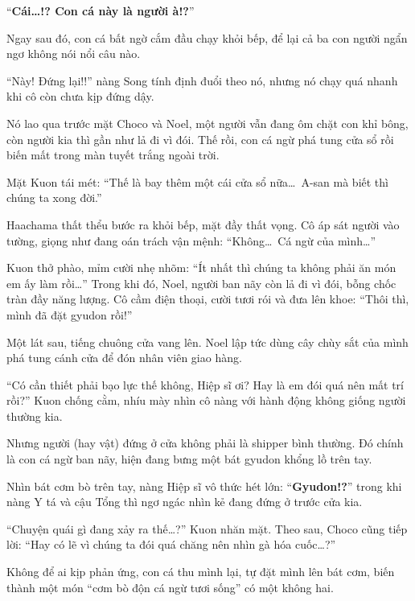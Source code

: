 \documentclass[../main.tex]{subfiles}
\begin{document}

``\textbf{Cái\dots!? Con cá này là người à!?}''

Ngay sau đó, con cá bất ngờ cắm đầu chạy khỏi bếp, để lại cả ba con người ngẩn ngơ không nói nổi câu nào.

``Này! Đứng lại!!'' nàng Song tính định đuổi theo nó, nhưng nó chạy quá nhanh khi cô còn chưa kịp đứng dậy.

Nó lao qua trước mặt Choco và Noel, một người vẫn đang ôm chặt con khỉ bông, còn người kia thì gần như lả đi vì đói. Thế rồi, con cá ngừ phá tung cửa sổ rồi biến mất trong màn tuyết trắng ngoài trời.


Mặt Kuon tái mét: ``Thế là bay thêm một cái cửa sổ nữa\dots\ A-san mà biết thì chúng ta xong đời.''

Haachama thất thểu bước ra khỏi bếp, mặt đầy thất vọng. Cô áp sát người vào tường, giọng như đang oán trách vận mệnh: ``Không\dots\ Cá ngừ của mình\dots''

Kuon thở phào, mỉm cười nhẹ nhõm: ``Ít nhất thì chúng ta không phải ăn món em ấy làm rồi\dots'' Trong khi đó, Noel, người ban nãy còn lả đi vì đói, bỗng chốc tràn đầy năng lượng. Cô cầm điện thoại, cười tươi rói và đưa lên khoe: ``Thôi thì, mình đã đặt gyudon rồi!''

\ct

Một lát sau, tiếng chuông cửa vang lên. Noel lập tức dùng cây chùy sắt của mình phá tung cánh cửa để đón nhân viên giao hàng.

``Có cần thiết phải bạo lực thế không, Hiệp sĩ ơi? Hay là em đói quá nên mất trí rồi?'' Kuon chống cằm, nhíu mày nhìn cô nàng với hành động không giống người thường kia.


Nhưng người (hay vật) đứng ở cửa không phải là shipper bình thường. Đó chính là con cá ngừ ban nãy, hiện đang bưng một bát gyudon khổng lồ trên tay.


Nhìn bát cơm bò trên tay, nàng Hiệp sĩ vô thức hét lớn: ``\textbf{Gyudon!?}'' trong khi nàng Y tá và cậu Tổng thì ngơ ngác nhìn kẻ đang đứng ở trước cửa kia.

``Chuyện quái gì đang xảy ra thế\dots?'' Kuon nhăn mặt. Theo sau, Choco cũng tiếp lời: ``Hay có lẽ vì chúng ta đói quá chăng nên nhìn gà hóa cuốc\dots?''

Không để ai kịp phản ứng, con cá thu mình lại, tự đặt mình lên bát cơm, biến thành một món ``cơm bò độn cá ngừ tươi sống'' có một không hai.
\end{document}
